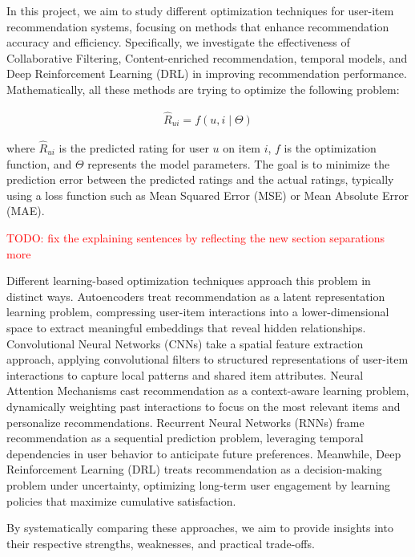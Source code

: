 \documentclass{ieeetj}
\begin{document}
In this project, we aim to study different optimization techniques for user-item recommendation systems, focusing on methods that enhance recommendation accuracy and efficiency. Specifically, we investigate the effectiveness of Collaborative Filtering, Content-enriched recommendation, temporal models, and Deep Reinforcement Learning (DRL) in improving recommendation performance. Mathematically, all these methods are trying to optimize the following problem:

\begin{equation}
\label{eq:opt}
\begin{aligned}
	\hat{R}_{ui} = f(u, i \mid \Theta)
\end{aligned}
\end{equation}

where $\hat{R}_{ui}$ is the predicted rating for user $u$ on item $i$, $f$ is the optimization function, and $\Theta$ represents the model parameters. The goal is to minimize the prediction error between the predicted ratings and the actual ratings, typically using a loss function such as Mean Squared Error (MSE) or Mean Absolute Error (MAE).


\textcolor{red}{TODO: fix the explaining sentences by reflecting the new section separations more}

Different learning-based optimization techniques approach this problem in distinct ways. Autoencoders treat recommendation as a latent representation learning problem, compressing user-item interactions into a lower-dimensional space to extract meaningful embeddings that reveal hidden relationships. Convolutional Neural Networks (CNNs) take a spatial feature extraction approach, applying convolutional filters to structured representations of user-item interactions to capture local patterns and shared item attributes. Neural Attention Mechanisms cast recommendation as a context-aware learning problem, dynamically weighting past interactions to focus on the most relevant items and personalize recommendations. Recurrent Neural Networks (RNNs) frame recommendation as a sequential prediction problem, leveraging temporal dependencies in user behavior to anticipate future preferences. Meanwhile, Deep Reinforcement Learning (DRL) treats recommendation as a decision-making problem under uncertainty, optimizing long-term user engagement by learning policies that maximize cumulative satisfaction.

By systematically comparing these approaches, we aim to provide insights into their respective strengths, weaknesses, and practical trade-offs.
\end{document}

